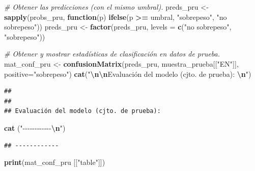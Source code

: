 \documentclass[
]{article}
\newenvironment{Shaded}{\begin{snugshade}}{\end{snugshade}}
\newcommand{\AttributeTok}[1]{\textcolor[rgb]{0.13,0.29,0.53}{#1}}
\newcommand{\CommentTok}[1]{\textcolor[rgb]{0.56,0.35,0.01}{\textit{#1}}}
\newcommand{\ControlFlowTok}[1]{\textcolor[rgb]{0.13,0.29,0.53}{\textbf{#1}}}
\newcommand{\FunctionTok}[1]{\textcolor[rgb]{0.13,0.29,0.53}{\textbf{#1}}}
\newcommand{\NormalTok}[1]{#1}
\newcommand{\OtherTok}[1]{\textcolor[rgb]{0.56,0.35,0.01}{#1}}
\newcommand{\SpecialCharTok}[1]{\textcolor[rgb]{0.81,0.36,0.00}{\textbf{#1}}}
\newcommand{\StringTok}[1]{\textcolor[rgb]{0.31,0.60,0.02}{#1}}
\begin{document}
\begin{Shaded}
\begin{Highlighting}[]
\CommentTok{\# Obtener las predicciones (con el mismo umbral). }
\NormalTok{preds\_pru }\OtherTok{\textless{}{-}} \FunctionTok{sapply}\NormalTok{(probs\_pru,}
                    \ControlFlowTok{function}\NormalTok{(p) }\FunctionTok{ifelse}\NormalTok{(p }\SpecialCharTok{\textgreater{}=}\NormalTok{ umbral, }\StringTok{"sobrepeso"}\NormalTok{, }\StringTok{"no sobrepeso"}\NormalTok{)) }
\NormalTok{preds\_pru }\OtherTok{\textless{}{-}} \FunctionTok{factor}\NormalTok{(preds\_pru, }\AttributeTok{levels =} \FunctionTok{c}\NormalTok{(}\StringTok{"no sobrepeso"}\NormalTok{, }\StringTok{"sobrepeso"}\NormalTok{))}

\CommentTok{\# Obtener y mostrar estadísticas de clasificación en datos de prueba. }
\NormalTok{mat\_conf\_pru }\OtherTok{\textless{}{-}} \FunctionTok{confusionMatrix}\NormalTok{(preds\_pru, muestra\_prueba[[}\StringTok{"EN"}\NormalTok{]],}
                                \AttributeTok{positive=}\StringTok{"sobrepeso"}\NormalTok{)}
\FunctionTok{cat}\NormalTok{(}\StringTok{"}\SpecialCharTok{\textbackslash{}n\textbackslash{}n}\StringTok{Evaluación del modelo (cjto. de prueba): }\SpecialCharTok{\textbackslash{}n}\StringTok{"}\NormalTok{)}
\end{Highlighting}
\end{Shaded}

\begin{verbatim}
## 
## 
## Evaluación del modelo (cjto. de prueba):
\end{verbatim}

\begin{Shaded}
\begin{Highlighting}[]
\FunctionTok{cat}\NormalTok{ (}\StringTok{"{-}{-}{-}{-}{-}{-}{-}{-}{-}{-}{-}{-}}\SpecialCharTok{\textbackslash{}n}\StringTok{"}\NormalTok{)}
\end{Highlighting}
\end{Shaded}

\begin{verbatim}
## ------------
\end{verbatim}

\begin{Shaded}
\begin{Highlighting}[]
\FunctionTok{print}\NormalTok{(mat\_conf\_pru [[}\StringTok{"table"}\NormalTok{]])}
\end{Highlighting}
\end{Shaded}
\end{document}
